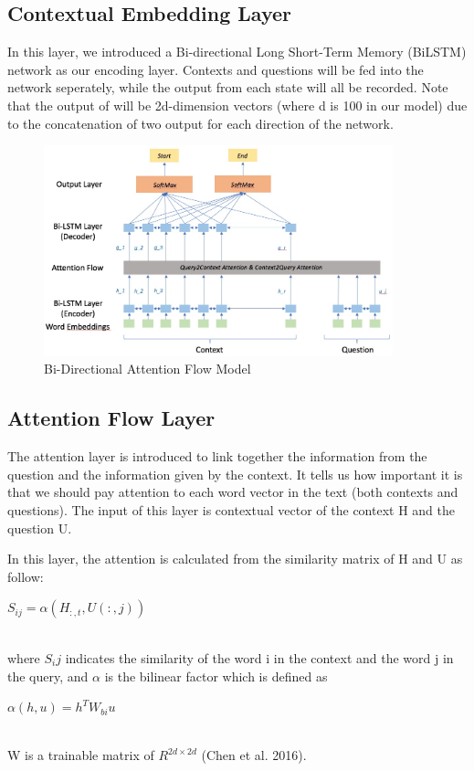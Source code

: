\documentclass{article} %
\begin{document}
\subsection{Contextual Embedding Layer}

In this layer, we introduced a Bi-directional Long Short-Term Memory (BiLSTM) network as our encoding layer. Contexts and questions will be fed into the network seperately, while the output from each state will all be recorded. Note that the output of will be 2d-dimension vectors (where d is 100 in our model) due to the concatenation of two output for each direction of the network.

\begin{figure}[h]
\begin{center}
\includegraphics[width=0.9\textwidth]{model_graph.jpeg}
\end{center}
\caption{Bi-Directional Attention Flow Model }
\end{figure}

\subsection{Attention Flow Layer}

The attention layer is introduced to link together the information from the question and the information given by the context. It tells us how important it is that we should pay attention to each word vector in the text (both contexts and questions). The input of this layer is contextual vector of the context H and the question U.

In this layer, the attention is calculated from the similarity matrix of H and U as follow:\\
\newline
\centerline{$S_{ij}=\alpha (H_{:,t}, U(:,j))$}\\
\newline
where $S_ij$ indicates the similarity of the word i in the context and the word j in the query, and $\alpha$ is the bilinear factor which is defined as\\
\newline
\centerline{$\alpha (h,u)=h^TW_{bi}u$}\\
\newline
W is a trainable matrix of $R^{2d\times 2d}$ (Chen et al. 2016).
\end{document}
